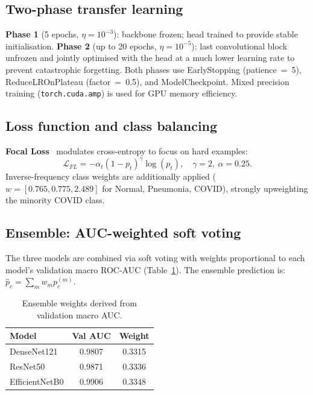 \documentclass{article}
\begin{document}
\subsection{Two-phase transfer learning}

\textbf{Phase 1} (5 epochs, $\eta=10^{-3}$): backbone frozen; head trained to provide
stable initialisation. \textbf{Phase 2} (up to 20 epochs, $\eta=10^{-5}$): last
convolutional block unfrozen and jointly optimised with the head at a much lower
learning rate to prevent catastrophic forgetting. Both phases use EarlyStopping
(patience~=~5), ReduceLROnPlateau (factor~=~0.5), and ModelCheckpoint. Mixed precision
training (\texttt{torch.cuda.amp}) is used for GPU memory efficiency.

\subsection{Loss function and class balancing}

\textbf{Focal Loss}~\cite{lin2017} modulates cross-entropy to focus on hard examples:
\[
  \mathcal{L}_{FL} = -\alpha_t (1 - p_t)^\gamma \log(p_t),\quad \gamma=2,\ \alpha=0.25.
\]
Inverse-frequency class weights are additionally applied
($w = [0.765, 0.775, 2.489]$ for Normal, Pneumonia, COVID), strongly upweighting the
minority COVID class.

\subsection{Ensemble: AUC-weighted soft voting}

The three models are combined via soft voting with weights proportional to each model's
validation macro ROC-AUC (Table~\ref{tab:ensemble}). The ensemble prediction is:
$\hat{p}_c = \sum_{m} w_m p_c^{(m)}$.

\begin{table}[h]
\centering
\caption{Ensemble weights derived from validation macro AUC.}
\label{tab:ensemble}
\small
\begin{tabular}{lcc}
\toprule
\textbf{Model} & \textbf{Val AUC} & \textbf{Weight}\\
\midrule
DenseNet121    & 0.9807 & 0.3315\\
ResNet50       & 0.9871 & 0.3336\\
EfficientNetB0 & 0.9906 & 0.3348\\
\bottomrule
\end{tabular}
\end{table}
\end{document}

